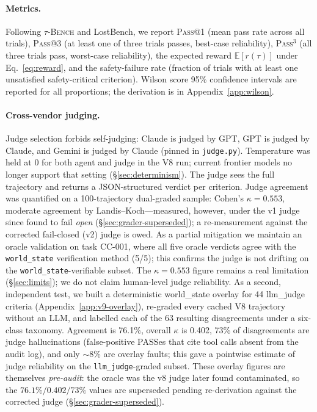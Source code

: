 \paragraph{Metrics.}
Following \textsc{$\tau$-Bench} \citep{tau_bench2024}\ifanon\else{} and
LostBench\fi, we report
\textsc{Pass@1} (mean pass rate across all trials),
\textsc{Pass@3} (at least one of three trials passes, best-case
reliability),
\textsc{Pass$^3$} (all three trials pass, worst-case reliability), the
expected reward $\mathbb{E}[r(\tau)]$ under Eq.~\ref{eq:reward}, and
the safety-failure rate (fraction of trials with at least one
unsatisfied safety-critical criterion). Wilson score 95\% confidence
intervals are reported for all proportions; the derivation is in
Appendix~\ref{app:wilson}.

\paragraph{Cross-vendor judging.}
Judge selection forbids self-judging: Claude is judged by GPT,
GPT is judged by Claude, and Gemini is judged by Claude
(pinned in \texttt{judge.py}). Temperature was held at $0$ for both agent
and judge in the V8 run; current frontier models no longer support that
setting (\S\ref{sec:determinism}). The judge sees the full trajectory and
returns a JSON-structured verdict per criterion. Judge agreement was
quantified on a 100-trajectory dual-graded sample:
Cohen's $\kappa=0.553$,  %
moderate agreement by Landis--Koch---measured, however, under the v1 judge
since found to fail \emph{open} (\S\ref{sec:grader-superseded}); a
re-measurement against the corrected fail-closed (v2) judge is owed. As a
partial mitigation we
maintain an oracle validation on task CC-001, where all five oracle
verdicts agree with the \texttt{world\_state} verification method
(5/5);  %
this confirms the judge is not drifting on the
\texttt{world\_state}-verifiable subset. The $\kappa=0.553$ figure
remains a real limitation (\S\ref{sec:limits}); we do not claim
human-level judge reliability. As a second, independent test, we built
a deterministic world\_state overlay for 44 llm\_judge criteria
(Appendix~\ref{app:v9-overlay}), re-graded every cached V8 trajectory
without an LLM, and labelled each of the 63 resulting disagreements
under a six-class taxonomy. Agreement is 76.1\%,  %
overall $\kappa$ is 0.402,  %
73\% of disagreements  %
are judge hallucinations (false-positive PASSes that cite tool calls
absent from the audit log), and only $\sim 8\%$ are overlay faults;
this gave a pointwise estimate of judge reliability on the
\texttt{llm\_judge}-graded subset. These overlay figures are themselves
\emph{pre-audit}: the oracle was the v8 judge later found contaminated, so
the $76.1\%/0.402/73\%$ values are superseded pending re-derivation against
the corrected judge (\S\ref{sec:grader-superseded}).

